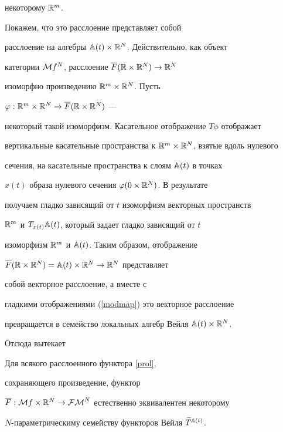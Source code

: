 некоторому ${\Bbb R}^m$.


Покажем, что это расслоение представляет собой


расслоение на алгебры ${\Bbb A}(t)\times{\Bbb R}^N$. Действительно, как объект


категории ${\cal M} f^N$, расслоение $\overline{F}({\Bbb R}\times{\Bbb R}^N)\rightarrow{\Bbb R}^N$


изоморфно произведению ${\Bbb R}^m\times{\Bbb R}^N$. Пусть


$\varphi:{\Bbb R}^m\times{\Bbb R}^N\rightarrow\overline{F}({\Bbb R}\times{\Bbb R}^N)$  ---


некоторый такой изоморфизм. Касательное отображение $T\phi$ отображает


вертикальные касательные пространства к ${\Bbb R}^m\times{\Bbb R}^N$, взятые вдоль нулевого


сечения, на касательные пространства к слоям ${\Bbb A}(t)$ в точках


$x(t)$ образа нулевого сечения $\varphi(0\times{\Bbb R}^N)$. В результате


получаем гладко зависящий от $t$ изоморфизм векторных пространств


${\Bbb R}^m$ и $T_{x(t)}{\Bbb A}(t)$, который задает гладко зависящий от $t$


изоморфизм ${\Bbb R}^m$ и ${\Bbb A}(t)$. Таким образом, отображение


$\overline{F}({\Bbb R}\times{\Bbb R}^N)={\Bbb A}(t)\times{\Bbb R}^N\rightarrow{\Bbb R}^N$ представляет


собой векторное расслоение, а вместе с


гладкими отображениями (\ref{modmap}) это векторное расслоение


превращается в семейство локальных алгебр Вейля ${\Bbb A}(t)\times{\Bbb R}^N$.





Отсюда вытекает








\begin{thm}


Для всякого расслоенного функтора \eqref{prol},


сохраняющего произведение, функтор


$\overline{F}:{\cal M} f\times{\Bbb R}^N\rightarrow{\cal{FM}}^N$ естественно эквивалентен некоторому


$N$-параметрическиму семейству функторов Вейля $\widetilde T{}^{{\Bbb A}(t)}$.


\end{thm}








